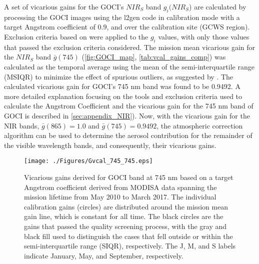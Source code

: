 \documentclass[10pt]{article}
\begin{document}
A set of vicarious gains for the GOCI's $NIR_S$ band $g_i(NIR_S$) are calculated by processing the GOCI images using the l2gen code in calibration mode with a target Angstrom coefficient of $0.9$, and over the calibration site (GCWS region). Exclusion criteria based on \cite{Bailey2006} were applied to the $g_i$ values, with only those values that passed the exclusion criteria considered. The mission mean vicarious gain for the $NIR_S$ band $\bar{g}(745)$ (\autoref{fig:GOCI_map}, \autoref{tab:vcal_gains_comp}) was calculated as the temporal average using the mean of the semi-interquartile range (MSIQR) to minimize the effect of spurious outliers, as suggested by \cite{Franz:07}. The calculated vicarious gain for GOCI's 745 nm band was found to be 0.9492. A more detailed explanation focusing on the tools and exclusion criteria used to calculate the Angstrom Coefficient and the vicarious gain for the 745 nm band of GOCI is described in  \autoref{sec:appendix_NIR}). Now, with the vicarious gain for the NIR bands, $\bar{g}(865)=1.0$ and $\bar{g}(745)=0.9492$, the atmospheric correction algorithm can be used to determine the aerosol contribution for the remainder of the visible wavelength bands, and consequently, their vicarious gains. 




\begin{figure}[H]
  \centering
  \texttt{[image: ./Figures/Gvcal\_745\_745.eps]}
    \caption{Vicarious gains derived for GOCI band at 745 nm based on a target Angstrom coefficient derived from MODISA data spanning the mission lifetime from May 2010 to March 2017. The individual calibration gains (circles) are distributed around the mission mean gain line, which is constant for all time. The black circles are the gains that passed the quality screening process, with the gray and black fill used to distinguish the cases that fell outside or within the semi-interquartile range (SIQR), respectively. The J, M, and S labels indicate January, May, and September, respectively. \label{fig:Gvcal_745}} 
\end{figure}
\end{document}
